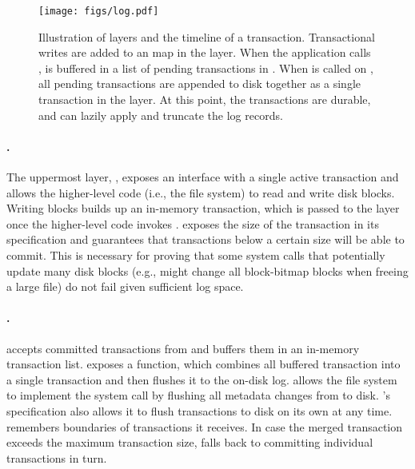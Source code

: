 \begin{figure}[htb]
  \centering
  \texttt{[image: figs/log.pdf]}
  \caption[Illustration of \syslog layers and the timeline of a transaction]
  { Illustration of \syslog layers and the timeline of a transaction.
  Transactional writes are added to an  map in the \logapi
  layer.  When the application calls ,  is buffered
  in a list of pending transactions in \grouplog. When  is called
  on \grouplog, all pending transactions are appended to disk together as a
  single transaction in the \disklog layer. At this point, the transactions
  are durable, and \memlog can lazily apply and truncate the log records.}
  \label{fig:log}
\end{figure}

\paragraph{\logapi.}

The uppermost layer, \logapi, exposes an interface with a single active
transaction and allows the higher-level code (i.e., the file system) to
read and write disk blocks.  Writing blocks builds up an in-memory
transaction, which is passed to the \grouplog layer once the higher-level
code invokes .  \logapi exposes the size of the transaction
in its specification and guarantees that transactions below a certain size
will be able to commit.  This is necessary for proving that some system
calls that potentially update many disk blocks (e.g.,  might
change all block-bitmap blocks when freeing a large file) do not fail given
sufficient log space.

\paragraph{\grouplog.}

\grouplog accepts committed transactions from \logapi and buffers them in
an in-memory transaction list.  \grouplog exposes a  function,
which combines all buffered transaction into a single transaction and then
flushes it to the on-disk log.   allows the file system to
implement the  system call by flushing all metadata changes from
\grouplog to disk.  \grouplog's specification also allows it to flush
transactions to disk on its own at any time.  \grouplog remembers
boundaries of transactions it receives. In case the merged transaction
exceeds the maximum transaction size, \grouplog falls back to committing
individual transactions in turn.

